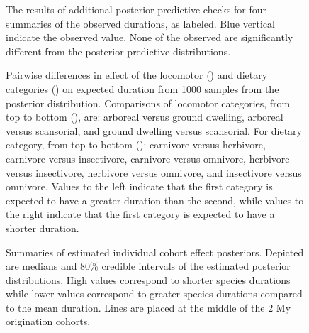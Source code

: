 \documentclass{nature}
\begin{document}
\begin{figure}[ht]
  \caption{The results of additional posterior predictive checks for four summaries of the observed durations, as labeled. Blue vertical indicate the observed value. None of the observed are significantly different from the posterior predictive distributions.}
  \label{fig:ppc_quant}
\end{figure}

\begin{figure}[ht]
  \begin{subfigure}[b]{0.4\textwidth}
    \caption{}
    \label{subfig:loco}
    \caption{}
    \label{subfig:diet}
  \end{subfigure}
  \caption{Pairwise differences in effect of the locomotor () and dietary categories () on expected duration from 1000 samples from the posterior distribution. Comparisons of locomotor categories, from top to bottom (), are: arboreal versus ground dwelling, arboreal versus scansorial, and ground dwelling versus scansorial. For dietary category, from top to bottom (): carnivore versus herbivore, carnivore versus insectivore, carnivore versus omnivore, herbivore versus insectivore, herbivore versus omnivore, and insectivore versus omnivore. Values to the left indicate that the first category is expected to have a greater duration than the second, while values to the right indicate that the first category is expected to have a shorter duration.}
  \label{fig:trait_est}
\end{figure}

\begin{figure}[ht]
  \caption{}
  \label{fig:eff_other}
\end{figure}

\begin{figure}[ht]
  \caption{Summaries of estimated individual cohort effect posteriors. Depicted are medians and 80\% credible intervals of the estimated posterior distributions. High values correspond to shorter species durations while lower values correspond to greater species durations compared to the mean duration. Lines are placed at the middle of the 2 My origination cohorts.}
  \label{fig:eff_cohort}
\end{figure}
\end{document}
